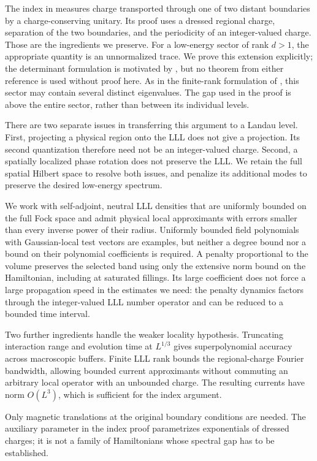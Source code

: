\documentclass[11pt]{article}
\theoremstyle{definition}
\theoremstyle{remark}
\begin{document}
The index in \cite{BBDF19} measures charge transported through one of
two distant boundaries by a charge-conserving unitary.  Its proof
uses a dressed regional charge, separation of the two boundaries,
and the periodicity of an integer-valued charge.  Those are the
ingredients we preserve.  For a low-energy sector of rank \(d>1\), the
appropriate quantity is an unnormalized trace.  We prove this
extension explicitly; the determinant formulation is motivated by
\cite{BBDF21}, but no theorem from either reference is used without
proof here.  As in the finite-rank formulation of \cite{BBDF21},
this sector may contain several distinct eigenvalues.  The gap used
in the proof is above the entire sector, rather than between its
individual levels.

There are two separate issues in transferring this argument to a
Landau level.  First, projecting a physical region onto the LLL does
not give a projection.  Its second quantization therefore need not
be an integer-valued charge.  Second, a spatially localized phase
rotation does not preserve the LLL.  We retain the full spatial
Hilbert space to resolve both issues, and penalize its additional
modes to preserve the desired low-energy spectrum.

We work with self-adjoint, neutral LLL densities that are uniformly
bounded on the full Fock space and admit physical local approximants
with errors smaller than every inverse power of their radius.
Uniformly bounded field polynomials with Gaussian-local test vectors
are examples, but neither a degree bound nor a bound on their polynomial
coefficients is required.  A penalty proportional to the volume
preserves the selected band using only the extensive norm bound on the
Hamiltonian, including at saturated fillings.  Its large coefficient
does not force a large propagation speed in the estimates we need:
the penalty dynamics factors through the integer-valued LLL number
operator and can be reduced to a bounded time interval.

Two further ingredients handle the weaker locality hypothesis.
Truncating interaction range and evolution time at \(L^{1/3}\)
gives superpolynomial accuracy across macroscopic buffers.
Finite LLL rank bounds the regional-charge Fourier bandwidth, allowing
bounded current approximants without commuting an arbitrary local
operator with an unbounded charge.  The resulting currents have norm
\(O(L^3)\), which is sufficient for the index argument.

Only magnetic translations at the original boundary conditions are
needed.  The auxiliary parameter in the index proof parametrizes
exponentials of dressed charges; it is not a family of Hamiltonians
whose spectral gap has to be established.
\end{document}
